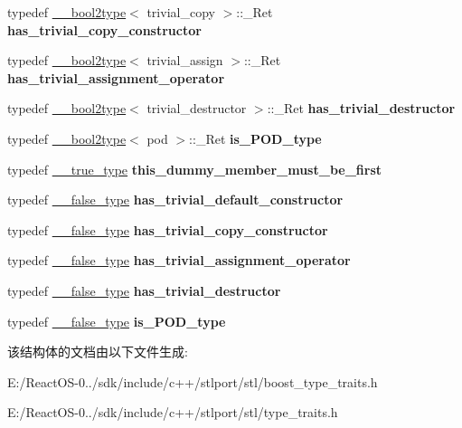 \begin{DoxyCompactItemize}
typedef \hyperlink{struct____bool2type}{\+\_\+\+\_\+bool2type}$<$ trivial\+\_\+copy $>$\+::\+\_\+\+Ret {\bfseries has\+\_\+trivial\+\_\+copy\+\_\+constructor}
\item 
\mbox{\label{struct____type__traits_afac39b915ca70ee7f50c43b1c7d569a4}} 
typedef \hyperlink{struct____bool2type}{\+\_\+\+\_\+bool2type}$<$ trivial\+\_\+assign $>$\+::\+\_\+\+Ret {\bfseries has\+\_\+trivial\+\_\+assignment\+\_\+operator}
\item 
\mbox{\label{struct____type__traits_a61d20ed50968c90ae7852321b0dc9d8b}} 
typedef \hyperlink{struct____bool2type}{\+\_\+\+\_\+bool2type}$<$ trivial\+\_\+destructor $>$\+::\+\_\+\+Ret {\bfseries has\+\_\+trivial\+\_\+destructor}
\item 
\mbox{\label{struct____type__traits_a4db22615c76a541b46652c7fb537fb40}} 
typedef \hyperlink{struct____bool2type}{\+\_\+\+\_\+bool2type}$<$ pod $>$\+::\+\_\+\+Ret {\bfseries is\+\_\+\+P\+O\+D\+\_\+type}
\item 
\mbox{\label{struct____type__traits_afe4c3f8654227c43039e6477b8fd048a}} 
typedef \hyperlink{struct____true__type}{\+\_\+\+\_\+true\+\_\+type} {\bfseries this\+\_\+dummy\+\_\+member\+\_\+must\+\_\+be\+\_\+first}
\item 
\mbox{\label{struct____type__traits_aedfbb7a580bff837b433aee30e85a80c}} 
typedef \hyperlink{struct____false__type}{\+\_\+\+\_\+false\+\_\+type} {\bfseries has\+\_\+trivial\+\_\+default\+\_\+constructor}
\item 
\mbox{\label{struct____type__traits_ab189584b93c601059d52f0bffd093240}} 
typedef \hyperlink{struct____false__type}{\+\_\+\+\_\+false\+\_\+type} {\bfseries has\+\_\+trivial\+\_\+copy\+\_\+constructor}
\item 
\mbox{\label{struct____type__traits_a83d8b6993bb96e5eb9051a559bd77525}} 
typedef \hyperlink{struct____false__type}{\+\_\+\+\_\+false\+\_\+type} {\bfseries has\+\_\+trivial\+\_\+assignment\+\_\+operator}
\item 
\mbox{\label{struct____type__traits_a846ccac85e2a58c4659caed13a048338}} 
typedef \hyperlink{struct____false__type}{\+\_\+\+\_\+false\+\_\+type} {\bfseries has\+\_\+trivial\+\_\+destructor}
\item 
\mbox{\label{struct____type__traits_a2e5a6cc072e54448c4ddaf316e9d9b75}} 
typedef \hyperlink{struct____false__type}{\+\_\+\+\_\+false\+\_\+type} {\bfseries is\+\_\+\+P\+O\+D\+\_\+type}
\end{DoxyCompactItemize}


该结构体的文档由以下文件生成\+:\begin{DoxyCompactItemize}
\item 
E\+:/\+React\+O\+S-\/0../sdk/include/c++/stlport/stl/boost\+\_\+type\+\_\+traits.\+h\item 
E\+:/\+React\+O\+S-\/0../sdk/include/c++/stlport/stl/type\+\_\+traits.\+h\end{DoxyCompactItemize}
